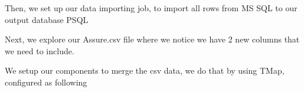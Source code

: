 Then, we set up our data importing job, to import all rows from MS SQL to our output database PSQL
\begin{figure}[H]
\centering
{}
\end{figure}
\vskip0.2cm
\begin{figure}[H]
\centering
{}
\end{figure}
\vskip0.2cm
\clearpage

Next, we explore our Assure.csv file where we notice we have 2 new columns that we need to include. 
\begin{figure}[H]
\centering
{}
\end{figure}
\vskip0.2cm

We setup our components to merge the csv data, we do that by using TMap, configured as following 
\begin{figure}[H]
\centering
{}
\end{figure}
\vskip0.2cm


